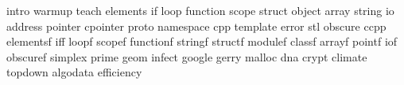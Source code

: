 intro
warmup
teach
elements
if
loop
function
scope
struct
object
array
string
io
address
pointer
cpointer
proto
namespace
cpp
template
error
stl
obscure
ccpp
elementsf
iff
loopf
scopef
functionf
stringf
structf
modulef
classf
arrayf
pointf
iof
obscuref
simplex
prime
geom
infect
google
gerry
malloc
dna
crypt
climate
topdown
algodata
efficiency
